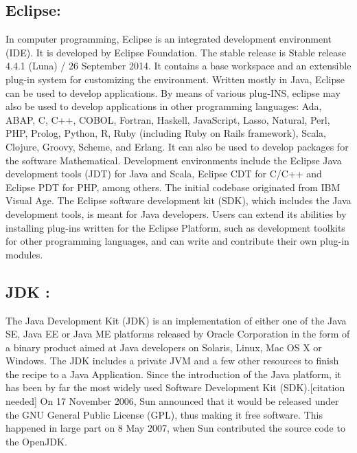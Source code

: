 \subsection{Eclipse: }
In computer programming, Eclipse is an integrated development environment (IDE). It is developed by Eclipse Foundation. The stable release is Stable release 4.4.1 (Luna) / 26 September 2014. It contains a base workspace and an extensible plug-in system for customizing the environment. Written mostly in Java, Eclipse can be used to develop applications. By means of various plug-INS, eclipse may also be used to develop applications in other programming languages: Ada, ABAP, C, C++, COBOL, Fortran, Haskell, JavaScript, Lasso, Natural, Perl, PHP, Prolog, Python, R, Ruby (including Ruby on Rails framework), Scala, Clojure, Groovy, Scheme, and Erlang. It can also be used to develop packages for the software Mathematical. Development environments include the Eclipse Java development tools (JDT) for Java and Scala, Eclipse CDT for C/C++ and Eclipse PDT for PHP, among others.
The initial codebase originated from IBM Visual Age. The Eclipse software development kit (SDK), which includes the Java development tools, is meant for Java developers. Users can extend its abilities by installing plug-ins written for the Eclipse Platform, such as development toolkits for other programming languages, and can write and contribute their own plug-in modules.

\subsection{JDK :}
The Java Development Kit (JDK) is an implementation of either one of the Java SE, Java EE or Java ME platforms released by Oracle Corporation in the form of a binary product aimed at Java developers on Solaris, Linux, Mac OS X or Windows. The JDK includes a private JVM and a few other resources to finish the recipe to a Java Application. Since the introduction of the Java platform, it has been by far the most widely used Software Development Kit (SDK).[citation needed] On 17 November 2006, Sun announced that it would be released under the GNU General Public License (GPL), thus making it free software. This happened in large part on 8 May 2007, when Sun contributed the source code to the OpenJDK.

